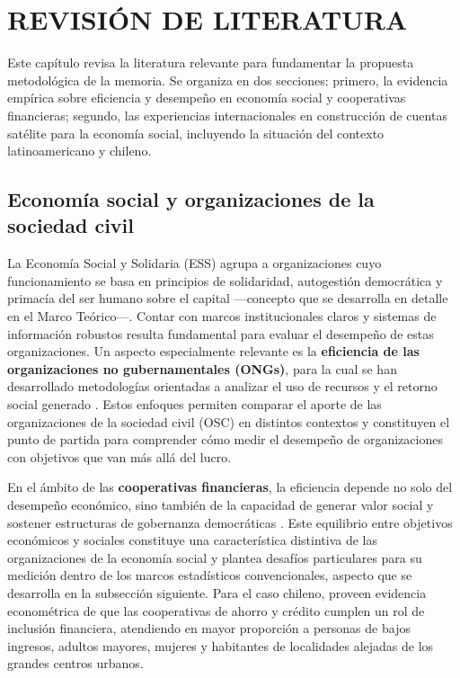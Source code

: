 \chapter{REVISIÓN DE LITERATURA}
\label{ch:revision}

Este capítulo revisa la literatura relevante para fundamentar la propuesta metodológica de la memoria. Se organiza en dos secciones: primero, la evidencia empírica sobre eficiencia
y desempeño en economía social y cooperativas financieras; segundo, las
experiencias internacionales en construcción de cuentas satélite para la
economía social, incluyendo la situación del contexto latinoamericano y
chileno.

\section{Economía social y organizaciones de la sociedad civil}

La Economía Social y Solidaria (ESS) agrupa a organizaciones cuyo funcionamiento 
se basa en principios de solidaridad, autogestión democrática y primacía del ser 
humano sobre el capital ---concepto que se desarrolla en detalle en el Marco 
Teórico---. Contar con marcos institucionales claros y sistemas de información 
robustos resulta fundamental para evaluar el desempeño de estas organizaciones.
Un aspecto especialmente relevante es la \textbf{eficiencia de las organizaciones no
gubernamentales (ONGs)}, para la cual se han desarrollado metodologías orientadas a
analizar el uso de recursos y el retorno social generado \cite{coupet_toward_2019}.
Estos enfoques permiten comparar el aporte de las organizaciones de la sociedad civil
(OSC) en distintos contextos y constituyen el punto de partida para comprender cómo
medir el desempeño de organizaciones con objetivos que van más allá del lucro.

En el ámbito de las \textbf{cooperativas financieras}, la eficiencia depende no solo
del desempeño económico, sino también de la capacidad de generar valor social y
sostener estructuras de gobernanza democráticas . Este
equilibrio entre objetivos económicos y sociales constituye una característica
distintiva de las organizaciones de la economía social y plantea desafíos particulares
para su medición dentro de los marcos estadísticos convencionales, aspecto que se
desarrolla en la subsección siguiente. Para el caso chileno, \cite{lemus_credit_2022}
proveen evidencia econométrica de que las cooperativas de ahorro y crédito cumplen un
rol de inclusión financiera, atendiendo en mayor proporción a personas de bajos
ingresos, adultos mayores, mujeres y habitantes de localidades alejadas de los
grandes centros urbanos.

